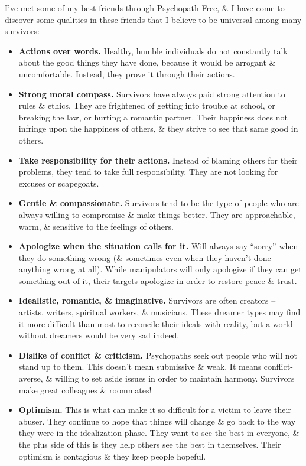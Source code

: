 \documentclass{article}
\numberwithin{equation}{section}
\begin{document}
I've met some of my best friends through Psychopath Free, \& I have come to discover some qualities in these friends that I believe to be universal among many survivors:
\begin{itemize}
	\item \textbf{Actions over words.} Healthy, humble individuals do not constantly talk about the good things they have done, because it would be arrogant \& uncomfortable. Instead, they prove it through their actions.
	\item \textbf{Strong moral compass.} Survivors have always paid strong attention to rules \& ethics. They are frightened of getting into trouble at school, or breaking the law, or hurting a romantic partner. Their happiness does not infringe upon the happiness of others, \& they strive to see that same good in others.
	\item \textbf{Take responsibility for their actions.} Instead of blaming others for their problems, they tend to take full responsibility. They are not looking for excuses or scapegoats.
	\item \textbf{Gentle \& compassionate.} Survivors tend to be the type of people who are always willing to compromise \& make things better. They are approachable, warm, \& sensitive to the feelings of others.
	\item \textbf{Apologize when the situation calls for it.} Will always say ``sorry'' when they do something wrong (\& sometimes even when they haven't done anything wrong at all). While manipulators will only apologize if they can get something out of it, their targets apologize in order to restore peace \& trust.
	\item \textbf{Idealistic, romantic, \& imaginative.} Survivors are often creators -- artists, writers, spiritual workers, \& musicians. These dreamer types may find it more difficult than most to reconcile their ideals with reality, but a world without dreamers would be very sad indeed.
	\item \textbf{Dislike of conflict \& criticism.} Psychopaths seek out people who will not stand up to them. This doesn't mean submissive \& weak. It means conflict-averse, \& willing to set aside issues in order to maintain harmony. Survivors make great colleagues \& roommates!
	\item \textbf{Optimism.} This is what can make it so difficult for a victim to leave their abuser. They continue to hope that things will change \& go back to the way they were in the idealization phase. They want to see the best in everyone, \& the plus side of this is they help others see the best in themselves. Their optimism is contagious \& they keep people hopeful.

\end{itemize}
\end{document}
